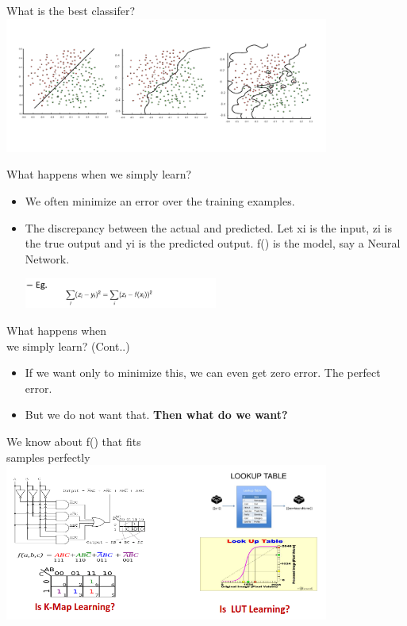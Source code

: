 \documentclass[aspectratio=169,14pt,usenames,dvipsnames]{beamer}
\begin{document}
\begin{frame}{What is the best classifer?}
\centering
\includegraphics[width=0.8\textwidth, height=0.7\textheight]{Images/AIML_OFG_6.png}

\end{frame}

\begin{frame}{What happens when we simply learn?}
\begin{itemize}
\item We often minimize an error over the training examples.
\item The discrepancy between the actual and predicted. Let xi is the input, zi is the true output and yi is the predicted output. f() is the model, say a Neural Network.

\includegraphics[width=0.5\textwidth, height=0.15\textheight]{Images/AIML_OFG_7.png}

\end{itemize}

\end{frame}


\begin{frame}{What happens when \\ we simply learn? (Cont..)}
\begin{itemize}
\item \alert{If we want only to minimize this, we can even get zero error. The perfect error. }
\item \alert{But we do not want that. \textbf{Then what do we want?}}

\end{itemize}

\end{frame}


\begin{frame}{We know about f() that fits \\ samples perfectly}
\centering
\includegraphics[width=0.8\textwidth, height=0.7\textheight]{Images/AIML_OFG_8.png}

\end{frame}
\end{document}
